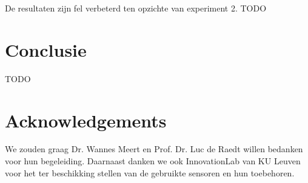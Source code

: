 \documentclass{article}
\begin{document}
De resultaten zijn fel verbeterd ten opzichte van experiment 2. TODO

\section{Conclusie}
TODO


\section*{Acknowledgements}
We zouden graag Dr. Wannes Meert en Prof. Dr. Luc de Raedt willen bedanken voor hun begeleiding. Daarnaast danken we ook InnovationLab van KU Leuven voor het ter beschikking stellen van de gebruikte sensoren en hun toebehoren.

\appendix



\end{document}
